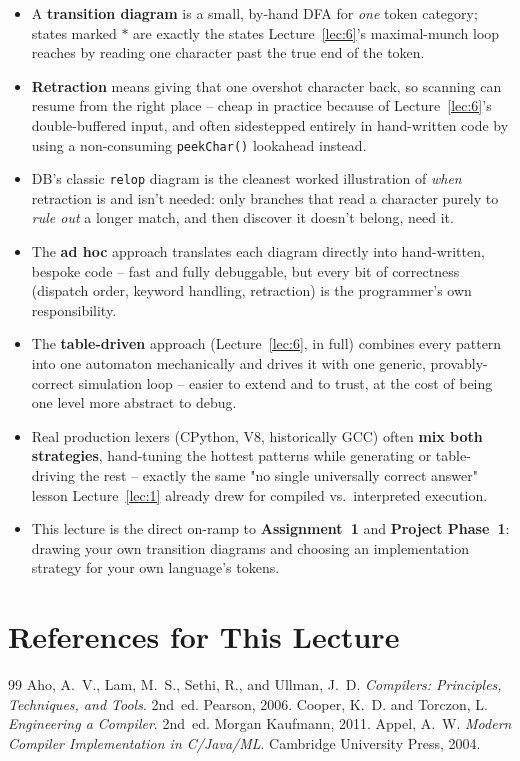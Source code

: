 \documentclass[full-course-notes.tex]{subfiles}
\begin{document}
\begin{takeaways}
\begin{itemize}
  \item A \textbf{transition diagram} is a small, by-hand DFA for \emph{one} token category;
  states marked $*$ are exactly the states Lecture~\ref{lec:6}'s maximal-munch loop reaches by
  reading one character past the true end of the token.
  \item \textbf{Retraction} means giving that one overshot character back, so scanning can
  resume from the right place -- cheap in practice because of Lecture~\ref{lec:6}'s
  double-buffered input, and often sidestepped entirely in hand-written code by using a
  non-consuming \texttt{peekChar()} lookahead instead.
  \item DB's classic \texttt{relop} diagram is the cleanest worked illustration of \emph{when}
  retraction is and isn't needed: only branches that read a character purely to \emph{rule out}
  a longer match, and then discover it doesn't belong, need it.
  \item The \textbf{ad hoc} approach translates each diagram directly into hand-written,
  bespoke code -- fast and fully debuggable, but every bit of correctness (dispatch order,
  keyword handling, retraction) is the programmer's own responsibility.
  \item The \textbf{table-driven} approach (Lecture~\ref{lec:6}, in full) combines every pattern
  into one automaton mechanically and drives it with one generic, provably-correct simulation
  loop -- easier to extend and to trust, at the cost of being one level more abstract to debug.
  \item Real production lexers (CPython, V8, historically GCC) often \textbf{mix both
  strategies}, hand-tuning the hottest patterns while generating or table-driving the rest --
  exactly the same "no single universally correct answer" lesson Lecture~\ref{lec:1} already
  drew for compiled vs.\ interpreted execution.
  \item This lecture is the direct on-ramp to \textbf{Assignment~1} and \textbf{Project
  Phase~1}: drawing your own transition diagrams and choosing an implementation strategy for
  your own language's tokens.
\end{itemize}
\end{takeaways}

\section*{References for This Lecture}
\begin{thebibliography}{99}
 Aho, A.~V., Lam, M.~S., Sethi, R., and Ullman, J.~D. \textit{Compilers:
Principles, Techniques, and Tools}. 2nd~ed. Pearson, 2006.
 Cooper, K.~D. and Torczon, L. \textit{Engineering a Compiler}. 2nd~ed. Morgan
Kaufmann, 2011.
 Appel, A.~W. \textit{Modern Compiler Implementation in C/Java/ML}. Cambridge
University Press, 2004.
\end{thebibliography}
\end{document}
